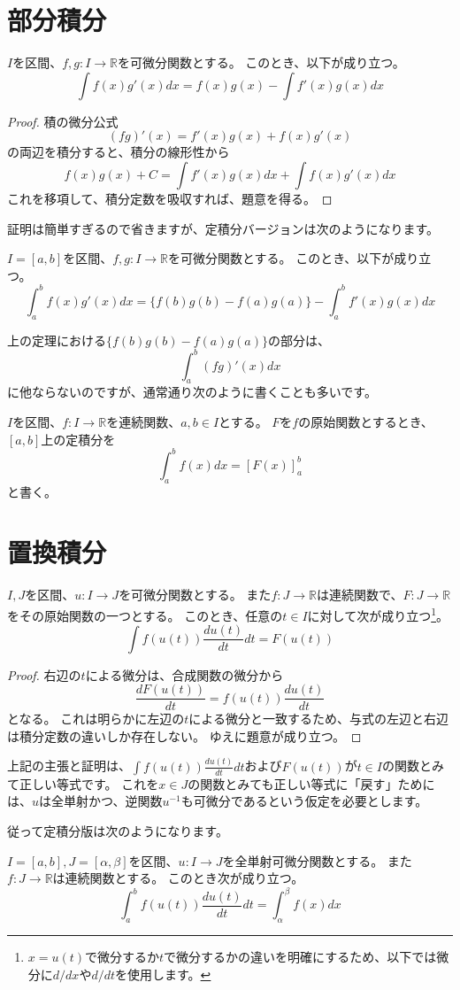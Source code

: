 \section{部分積分}

\begin{theorem}
  $I$を区間、$f,g:I\to\mathbb{R}$を可微分関数とする。
  このとき、以下が成り立つ。
  \[
    \int f(x)g'(x)dx=f(x)g(x)-\int f'(x)g(x)dx
  \]
\end{theorem}
\begin{proof}
  積の微分公式
  \[
    (fg)'(x)=f'(x)g(x)+f(x)g'(x)
  \]
  の両辺を積分すると、積分の線形性から
  \[
    f(x)g(x)+C=\int f'(x)g(x)dx+\int f(x)g'(x)dx
  \]
  これを移項して、積分定数を吸収すれば、題意を得る。
\end{proof}

証明は簡単すぎるので省きますが、定積分バージョンは次のようになります。
\begin{theorem}
  $I=[a,b]$を区間、$f,g:I\to\mathbb{R}$を可微分関数とする。
  このとき、以下が成り立つ。
  \[
    \int_a^b f(x)g'(x)dx=\{f(b)g(b)-f(a)g(a)\}-\int_a^b f'(x)g(x)dx
  \]
\end{theorem}

上の定理における$\{f(b)g(b)-f(a)g(a)\}$の部分は、
\[
  \int_a^b(fg)'(x)dx
\]
に他ならないのですが、通常通り次のように書くことも多いです。
\begin{definition}
  $I$を区間、$f:I\to\mathbb{R}$を連続関数、$a,b\in I$とする。
  $F$を$f$の原始関数とするとき、$[a,b]$上の定積分を
  \[
    \int_a^bf(x)dx=[F(x)]_a^b
  \]
  と書く。
\end{definition}

\section{置換積分}

\begin{theorem}
  $I,J$を区間、$u:I\to J$を可微分関数とする。
  また$f:J\to\mathbb{R}$は連続関数で、$F:J\to\mathbb{R}$をその原始関数の一つとする。
  このとき、任意の$t\in I$に対して次が成り立つ\footnote{
    $x=u(t)$で微分するか$t$で微分するかの違いを明確にするため、以下では微分に$d/dx$や$d/dt$を使用します。
  }。
  \[
    \int f(u(t))\frac{du(t)}{dt}dt=F(u(t))
  \]
\end{theorem}
\begin{proof}
  右辺の$t$による微分は、合成関数の微分から
  \[
    \frac{dF(u(t))}{dt}=f(u(t))\frac{du(t)}{dt}
  \]
  となる。
  これは明らかに左辺の$t$による微分と一致するため、与式の左辺と右辺は積分定数の違いしか存在しない。
  ゆえに題意が成り立つ。
\end{proof}
上記の主張と証明は、$\int f(u(t))\frac{du(t)}{dt}dt$および$F(u(t))$が$t\in I$の関数とみて正しい等式です。
これを$x\in J$の関数とみても正しい等式に「戻す」ためには、$u$は全単射かつ、逆関数$u^{-1}$も可微分であるという仮定を必要とします。

従って定積分版は次のようになります。
\begin{theorem}
  $I=[a,b],J=[\alpha,\beta]$を区間、$u:I\to J$を全単射可微分関数とする。
  また$f:J\to\mathbb{R}$は連続関数とする。
  このとき次が成り立つ。
  \[
    \int_a^b f(u(t))\frac{du(t)}{dt}dt=\int_\alpha^\beta f(x)dx
  \]
\end{theorem}
